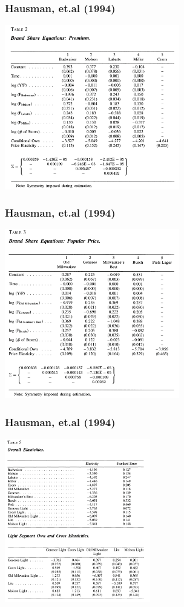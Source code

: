 \documentclass[xcolor=pdftex,dvipsnames,table,mathserif,aspectratio=169]{beamer}
\begin{document}
\begin{frame}
\frametitle{Hausman, et.al (1994)}
\begin{center}
\includegraphics[width=3in]{resources/beer2.png}
\end{center}
\end{frame} 

\begin{frame}
\frametitle{Hausman, et.al (1994)}
\begin{center}
\includegraphics[width=3in]{resources/beer3.png}
\end{center}
\end{frame} 

\begin{frame}
\frametitle{Hausman, et.al (1994)}
\begin{center}
\includegraphics[width=2.5in]{resources/beer5.png}
\end{center}
\end{frame} 
\end{document}
